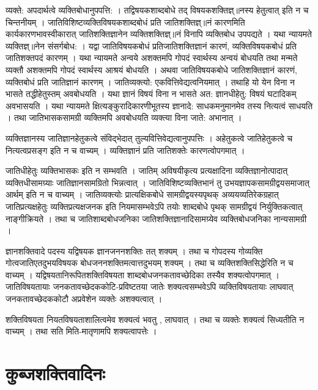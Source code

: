 {व्यक्ते: अपदार्थत्वे व्यक्तिबोधानुपपत्ति: । तद्विषयकशाब्दबोधे तद् विषयकशक्तिज्ञ्॥नस्य हेतुत्वात् इति न च चिन्तनीयम् । जातिविशिष्टव्यक्तिविषयकशाब्दबोधं प्रति जातिशक्तिज्ञ्॥नं कारणमिति कार्यकारणभावस्वीकारात् जातिशक्तिज्ञानेन व्यक्तिशक्तिज्ञ्॥नं विनापि व्यक्तिबोध उपपद्यते । यथा न्यायमते व्यक्तिज्ञ्॥नेन संसर्गबोध: । यद्वा जातिविषयकबोधं प्रतिजातिशक्तिज्ञानं कारणं, व्यक्तिविषयकबोधं प्रति जातिशक्तपदं कारणम् । यथा न्यायमते अन्वये अशक्तमपि गोपदं स्वार्थस्य अन्वयं बोधयति तथा मन्मते व्यक्तौ अशक्तमपि गोपदं स्वार्थस्य आश्रयं बोधयति । अथवा जातिविषयकबोधे जातिशक्तिज्ञानं कारणं, व्यक्तिबोधं प्रति जातिज्ञानं कारणम् । जातिव्यक्त्यो: एकवित्तिवेद्यत्वनियमात् । तथाहि यो येन विना न भासते तद्धीहेतुस्तम् अवबोधयति । यथा ज्ञानं विषयं विना न भासते अत: ज्ञानधीहेतु: विषयं घटादिकम् अवभासयति । यथा न्यायमते क्षित्यङ्कुरादिकारणीभूतस्य ज्ञानादे: साधकमनुमानमेव तस्य नित्यत्वं साधयति । तथा जातिभासकसामग्री व्यक्तिमपि अवबोधयति व्यक्त्या विना जाते: अभानात् । 

व्यक्तिज्ञानस्य जातिज्ञानहेतुकत्वे संविद्भेदात् तुल्यवित्तिवेद्यत्वानुपपत्तिः । अहेतुकत्वे जातिहेतुकत्वे च नित्यत्वप्रसङ्ग इति न च वाच्यम् । व्यक्तिज्ञानं प्रति जातिशक्तेः कारणत्वोपगमात् ।

जातिधीहेतुः व्यक्तिभासकः इति न सम्भवति । जातिम् अविषयीकृत्य प्रत्यक्षादिना व्यक्तिज्ञानोत्पादात् व्यक्तिधीसामग्र्याः जातिज्ञानसामग्रितो भिन्नत्वात् । जातिविशिष्टव्यक्तिभानं तु उभयज्ञापकसामग्रीद्वयसमाजात् आर्थम्  इति न च वाच्यम् । जातिव्यक्त्योः  प्रात्यक्षिकबोधे सामग्रीद्वयस्यपृथक् अव्ययव्यतिरेकग्रहात् जातिप्रत्यक्षहेतुः व्यक्तिप्रत्यक्षजनक इति नियमासम्भवेऽपि तयोः शाब्दबोधे पृथक् सामग्रीद्वयं निर्युक्तिकत्वात् नाङ्गीक्रियते । तथा च जातिशाब्दबोधजनिका जातिशक्तिज्ञानादिसामग्र्येव व्यक्तिबोधजनिका नान्यसामग्री ।

ज्ञानशक्तिवादे पदस्य यद्विषयक ज्ञानजननशक्तिः तत् शक्यम् । तथा च गोपदस्य गोव्यक्ति गोत्वजातिएतदुभयविषयक बोधजननशक्तिमत्वात्तदुभयम् शक्यम् । तथा च व्यक्तिशक्तिसिद्धेरिति न च वाच्यम् । यद्विषयतानिरूपितशक्तिविषयता शाब्दबोधजनकतावच्छेदिका तस्यैव शक्यत्वोपगमात् । जातिविषयतायाः जनकतावच्छेदककोटि-प्रविष्टतया जातेः शक्यत्वसम्भवेऽपि व्यक्तिविषयतायाः लाघवात् जनकतावच्छेदककोटौ अप्रवेशेन व्यक्तेः अशक्यत्वात् ।

शक्तिविषयता नियतविषयताशालित्वमेव शक्यत्वं भवतु , लाघवात् । तथा च व्यक्तेः  शक्यत्वं सिध्यतीति न वाच्यम् । तथा सति मिति-मातृणामपि शक्यत्वापत्तेः ।

\section*{कुब्जशक्तिवादिनः}

}
